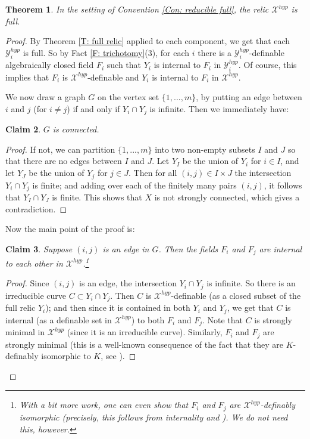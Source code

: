\documentclass{amsart}
\newtheorem{theorem}{Theorem}[section]
\newtheorem{claim}[theorem]{Claim}
\theoremstyle{definition}
\begin{document}
\begin{theorem}\label{T: reducible full}
    In the setting of Convention \ref{Con: reducible full}, the relic $\mathcal X^{hyp}$ is full.
\end{theorem}
\begin{proof}
    By Theorem \ref{T: full relic} applied to each component, we get that each $\mathcal Y_i^{hyp}$ is full. So by Fact \ref{F: trichotomy}(3), for each $i$ there is a $\mathcal Y_i^{hyp}$-definable algebraically closed field $F_i$ such that $Y_i$ is internal to $F_i$ in $\mathcal Y_i^{hyp}$. Of course, this implies that $F_i$ is $\mathcal X^{hyp}$-definable and $Y_i$ is internal to $F_i$ in $\mathcal X^{hyp}$.

    We now draw a graph $G$ on the vertex set $\{1,...,m\}$, by putting an edge between $i$ and $j$ (for $i\neq j$) if and only if $Y_i\cap Y_j$ is infinite. Then we immediately have:

    \begin{claim}
        $G$ is connected.
    \end{claim}
    \begin{proof}
        If not, we can partition $\{1,...,m\}$ into two non-empty subsets $I$ and $J$ so that there are no edges between $I$ and $J$. Let $Y_I$ be the union of $Y_i$ for $i\in I$, and let $Y_J$ be the union of $Y_j$ for $j\in J$. Then for all $(i,j)\in I\times J$ the intersection $Y_i\cap Y_j$ is finite; and adding over each of the finitely many pairs $(i,j)$, it follows that $Y_I\cap Y_J$ is finite. This shows that $X$ is not strongly connected, which gives a contradiction.
    \end{proof}

    Now the main point of the proof is:
    \begin{claim}
        Suppose $(i,j)$ is an edge in $G$. Then the fields $F_i$ and $F_j$ are internal to each other in $\mathcal X^{hyp}$.\footnote{With a bit more work, one can even show that $F_i$ and $F_j$ are \textit{$\mathcal X^{hyp}$-definably isomorphic} (precisely, this follows from internality and \cite[Theorem 4.15]{PoiGroups}). We do not need this, however.}
    \end{claim}
    \begin{proof} Since $(i,j)$ is an edge, the intersection $Y_i\cap Y_j$ is infinite. So there is an irreducible curve $C\subset Y_i\cap Y_j$. Then $C$ is $\mathcal X^{hyp}$-definable (as a closed subset of the full relic $Y_i$); and then since it is contained in both $Y_i$ and $Y_j$, we get that $C$ is internal (as a definable set in $\mathcal X^{hyp}$) to both $F_i$ and $F_j$. Note that $C$ is strongly minimal in $\mathcal X^{hyp}$ (since it is an irreducible curve). Similarly, $F_i$ and $F_j$ are strongly minimal (this is a well-known consequence of the fact that they are $K$-definably isomorphic to $K$, see \cite[Theorem 4.15]{PoiGroups}).


\end{proof}
\end{proof}
\end{document}
